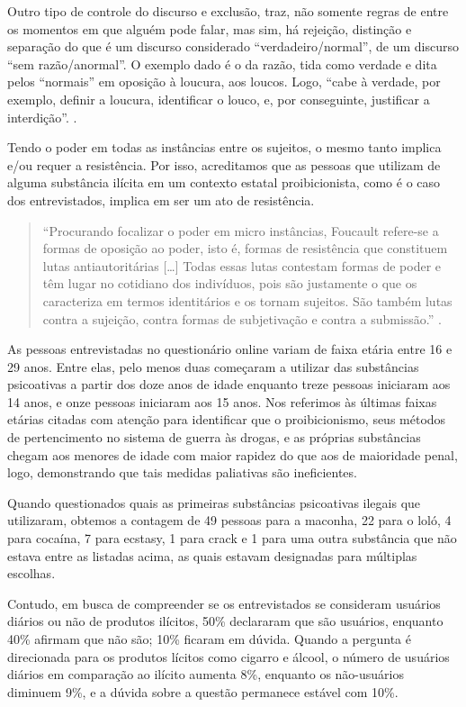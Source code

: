 \begin{refsection}
    Outro tipo de controle do discurso e exclusão, traz, não somente regras de entre os momentos em que alguém pode falar, mas sim, há rejeição, distinção e separação do que é um discurso considerado ``verdadeiro/normal'', de um discurso ``sem razão/anormal''. O exemplo dado é o da razão, tida como verdade e dita pelos ``normais'' em oposição à loucura, aos loucos. Logo, ``cabe à verdade, por exemplo, definir a loucura, identificar o louco, e, por conseguinte, justificar a interdição''. \cite[p.~48]{Fernandes2012Discurso}.

    Tendo o poder em todas as instâncias entre os sujeitos, o mesmo tanto implica e/ou requer a resistência. Por isso, acreditamos que as pessoas que utilizam de alguma substância ilícita em um contexto estatal proibicionista, como é o caso dos entrevistados, implica em ser um ato de resistência.

    \begin{quotation}
        ``Procurando focalizar o poder em micro instâncias, Foucault refere-se a formas de oposição ao poder, isto é, formas de resistência que constituem lutas antiautoritárias [\dots] Todas essas lutas contestam formas de poder e têm lugar no cotidiano dos indivíduos, pois são justamente o que os caracteriza em termos identitários e os tornam sujeitos. São também lutas contra a sujeição, contra formas de subjetivação e contra a submissão.'' \cite[p.~56--57]{Fernandes2012Discurso}. 
    \end{quotation}

    As pessoas entrevistadas no questionário online variam de faixa etária entre 16 e 29 anos. Entre elas, pelo menos duas começaram a utilizar das substâncias psicoativas a partir dos doze anos de idade enquanto treze pessoas iniciaram aos 14 anos, e onze pessoas iniciaram aos 15 anos. Nos referimos às últimas faixas etárias citadas com atenção para identificar que o proibicionismo, seus métodos de pertencimento no sistema de guerra às drogas, e as próprias substâncias chegam aos menores de idade com maior rapidez do que aos de maioridade penal, logo, demonstrando que tais medidas paliativas são ineficientes. 

    Quando questionados quais as primeiras substâncias psicoativas ilegais que utilizaram, obtemos a contagem de 49 pessoas para a maconha, 22 para o loló, 4 para cocaína, 7 para ecstasy, 1 para crack e 1 para uma outra substância que não estava entre as listadas acima, as quais estavam designadas para múltiplas escolhas.  

    Contudo, em busca de compreender se os entrevistados se consideram usuários diários ou não de produtos ilícitos, 50\% declararam que são usuários, enquanto 40\% afirmam que não são; 10\% ficaram em dúvida. Quando a pergunta é direcionada para os produtos lícitos como cigarro e álcool, o número de usuários diários em comparação ao ilícito aumenta 8\%, enquanto os não-usuários diminuem 9\%, e a dúvida sobre a questão permanece estável com 10\%.


\end{refsection}
